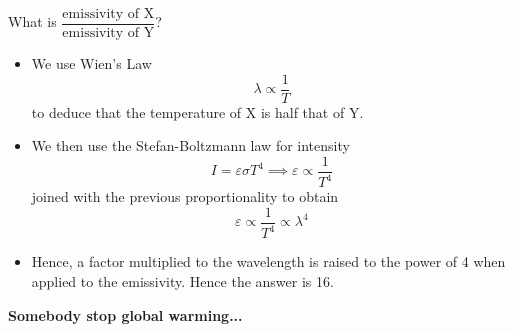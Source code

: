 \documentclass[a4paper,12pt]{article}
\begin{document}
What is $\dfrac{\text{emissivity of X}}{\text{emissivity of Y}}$?

\begin{itemize}
  \item We use Wien's Law $$\lambda \propto \frac{1}{T}$$
        to deduce that the temperature of X is half that of Y.
  \item We then use the Stefan-Boltzmann law for intensity $$I = \varepsilon \sigma T^4 \implies \varepsilon \propto \frac{1}{T^4}$$
        joined with the previous proportionality to obtain
        $$\varepsilon \propto \frac{1}{T^4} \propto \lambda^4$$
  \item Hence, a factor multiplied to the wavelength is raised to the power of 4 when applied to the emissivity. Hence the answer is 16.
\end{itemize}

\pagebreak

\vspace*{10cm}

\begin{center}
  \textbf{\Huge{Somebody stop global warming...}}
\end{center}
\end{document}
